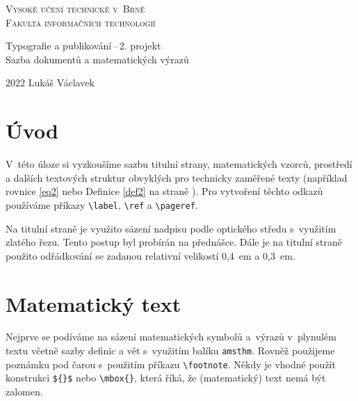 \documentclass[a4paper, twocolumn, 11pt]{article}
\begin{document}
\begin{titlepage}
\begin{center}

\newtheorem{definice}{Definice}
\newtheorem{veta}{Věta}

\textsc{\Huge{Vysoké učení technické v~Brně}\\[0,4em]
\huge{Fakulta informačních technologií}}\\[0,3em]


{\LARGE
	Typografie a publikování\,--\,2. projekt\\
	Sazba dokumentů a matematických výrazů\\
}

\end{center}

{\Large 2022 \hfill Lukáš Václavek}
\end{titlepage}

\section*{Úvod}
V~této úloze si vyzkoušíme sazbu titulní strany, matematických vzorců, prostředí a dalších textových struktur obvyklých pro technicky zaměřené texty (například rovnice \eqref{eq2} nebo Definice \ref{def2} na straně \pageref{def2}). Pro vytvoření těchto odkazů používáme příkazy \verb|\label|, \verb|\ref| a \verb|\pageref|.

Na titulní straně je využito sázení nadpisu podle optického středu s~využitím zlatého řezu. Tento postup byl probírán na přednášce. Dále je na titulní straně použito odřádkování se zadanou relativní velikostí 0,4~em a 0,3~em.

\section{Matematický text}

Nejprve se podíváme na sázení matematických symbolů a~výrazů v~plynulém textu včetně sazby definic a vět s~využitím balíku \texttt{amsthm}. Rovněž použijeme poznámku pod čarou s~použitím příkazu \verb|\footnote|. Někdy je vhodné použít konstrukci \verb|${}$| nebo \verb|\mbox{}|, která říká, že (matematický) text nemá být zalomen. 
\end{document}
